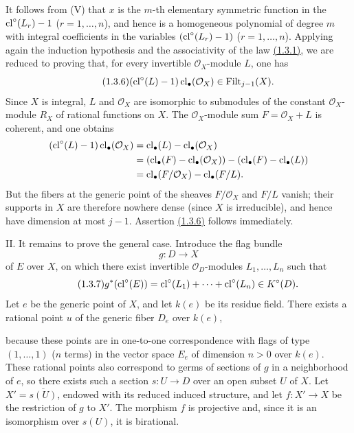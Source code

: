 It follows from (V) that $x$ is the $m$-th elementary symmetric function in
the $\operatorname{cl}^\circ(L_r)-1$ ($r=1,\ldots,n$), and hence is a homogeneous
polynomial of degree $m$ with integral coefficients in the variables
$(\operatorname{cl}^\circ(L_r)-1)$ ($r=1,\ldots,n$). Applying again the induction
hypothesis and the associativity of the law \hyperlink{sga6.e10.eq.1-3-1}{(1.3.1)}, we are reduced to proving
that, for every invertible $\mathcal O_X$-module $L$, one has
\begin{equation}\tag{1.3.6}
(\operatorname{cl}^\circ(L)-1)\operatorname{cl}_\bullet(\mathcal O_X)\in\operatorname{Filt}_{j-1}(X).
\end{equation}
Since $X$ is integral, $L$ and $\mathcal O_X$ are isomorphic to submodules of
the constant $\mathcal O_X$-module $R_X$ of rational functions on $X$. The
$\mathcal O_X$-module sum $F=\mathcal O_X+L$ is coherent, and one obtains
\begin{align*}
(\operatorname{cl}^\circ(L)-1)\operatorname{cl}_\bullet(\mathcal O_X)
&=\operatorname{cl}_\bullet(L)-\operatorname{cl}_\bullet(\mathcal O_X)\\
&=(\operatorname{cl}_\bullet(F)-\operatorname{cl}_\bullet(\mathcal O_X))
  -(\operatorname{cl}_\bullet(F)-\operatorname{cl}_\bullet(L))\\
&=\operatorname{cl}_\bullet(F/\mathcal O_X)-\operatorname{cl}_\bullet(F/L).
\end{align*}
But the fibers at the generic point of the sheaves $F/\mathcal O_X$ and
$F/L$ vanish; their supports in $X$ are therefore nowhere dense (since $X$
is irreducible), and hence have dimension at most $j-1$. Assertion \hyperlink{sga6.e10.eq.1-3-6}{(1.3.6)}
follows immediately.

II. It remains to prove the general case. Introduce the flag bundle
\[
g:D\longrightarrow X
\]
of $E$ over $X$, on which there exist invertible $\mathcal O_D$-modules
$L_1,\ldots,L_n$ such that
\begin{equation}\tag{1.3.7}
g^*(\operatorname{cl}^\circ(E))=\operatorname{cl}^\circ(L_1)+\cdots+\operatorname{cl}^\circ(L_n)\in K^\circ(D).
\end{equation}
Let $e$ be the generic point of $X$, and let $k(e)$ be its residue field.
There exists a rational point $u$ of the generic fiber $D_e$ over $k(e)$,

because these points are in one-to-one correspondence with flags of type
$(1,\ldots,1)$ ($n$ terms) in the vector space $E_e$ of dimension $n>0$ over
$k(e)$. These rational points also correspond to germs of sections of $g$ in
a neighborhood of $e$, so there exists such a section $s:U\to D$ over an
open subset $U$ of $X$. Let $X'=\overline{s(U)}$, endowed with its reduced
induced structure, and let $f:X'\to X$ be the restriction of $g$ to $X'$.
The morphism $f$ is projective and, since it is an isomorphism over $s(U)$,
it is birational.

